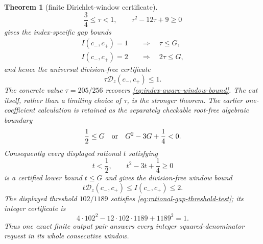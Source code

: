 \documentclass[11pt]{article}
\newtheorem{theorem}{Theorem}[section]
\begin{document}
\begin{theorem}[finite Dirichlet-window certificate]
\begin{equation}
\label{eq:optimal-rational-gap-threshold-test}
 \frac34\le\tau<1,\qquad \tau^2-12\tau+9\ge0
\end{equation}
gives the index-specific gap bounds
\begin{equation}
\label{eq:optimal-rational-gap-bounds}
 \begin{aligned}
 I(c_-,c_+)=1&\quad\Longrightarrow\quad \tau\le G,\\
 I(c_-,c_+)=2&\quad\Longrightarrow\quad 2\tau\le G,
 \end{aligned}
\end{equation}
and hence the universal division-free certificate
\begin{equation}
\label{eq:optimal-rational-window-bound}
             \tau\mathcal D_z(c_-,c_+)\le1.
\end{equation}
The concrete value $\tau=205/256$ recovers
\eqref{eq:index-aware-window-bound}.  The cut itself, rather than a limiting
choice of $\tau$, is the stronger theorem.
The earlier one-coefficient calculation is retained as the separately
checkable root-free algebraic boundary
\begin{equation}
\label{eq:normalized-gap-quadratic}
 \frac12\le G
 \quad\hbox{or}\quad
G^2-3G+\frac14<0.
\end{equation}
Consequently every displayed rational $t$ satisfying
\begin{equation}
\label{eq:rational-gap-threshold-test}
 t<\frac12,\qquad t^2-3t+\frac14\ge0
\end{equation}
is a certified lower bound $t\le G$ and gives the division-free window bound
\begin{equation}
\label{eq:rational-threshold-window-bound}
       t\mathcal D_z(c_-,c_+)\le I(c_-,c_+)\le2.
\end{equation}
The displayed threshold $102/1189$ satisfies
\eqref{eq:rational-gap-threshold-test}; its integer certificate is
\begin{equation}
\label{eq:quadratic-gap-integer-certificate}
 4\mathbin{\cdot}102^2-12\mathbin{\cdot}102\mathbin{\cdot}1189+1189^2=1.
\end{equation}
Thus one exact finite output pair answers every integer squared-denominator
request in its whole consecutive window.
\end{theorem}
\end{document}
